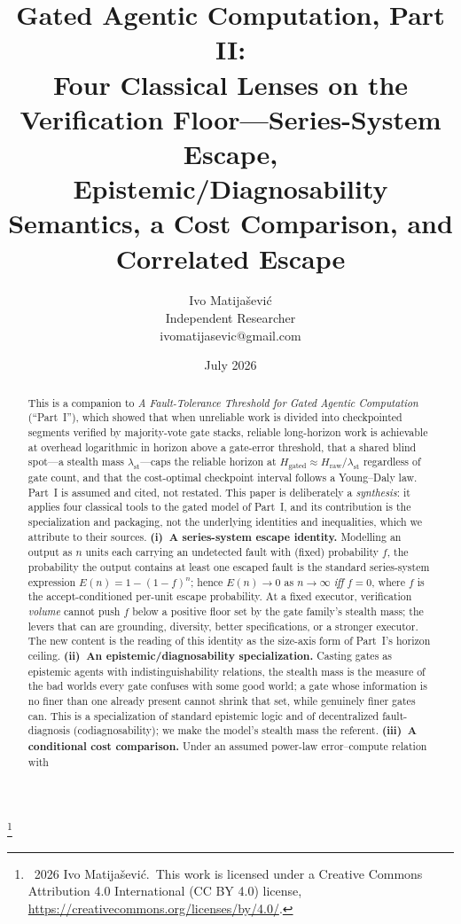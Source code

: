 \documentclass[11pt]{article}
\title{\vspace{-2em}Gated Agentic Computation, Part II:\\
\large Four Classical Lenses on the Verification Floor---Series-System Escape,\\
Epistemic/Diagnosability Semantics, a Cost Comparison, and Correlated Escape}
\author{Ivo Matija\v{s}evi\'c\\ \small Independent Researcher \\ \small ivomatijasevic@gmail.com}
\date{July 2026}
\theoremstyle{definition}
\theoremstyle{remark}
\newcommand{\lst}{\lambda_{\mathrm{st}}}
\newcommand{\Hraw}{H_{\mathrm{raw}}}
\newcommand{\Hgated}{H_{\mathrm{gated}}}
\newcommand{\Esc}{E}
\newcommand{\fesc}{f}
\newcommand\blfootnote[1]{\begingroup\renewcommand\thefootnote{}\footnote{#1}\addtocounter{footnote}{-1}\endgroup}
\begin{document}
\maketitle
\blfootnote{\textcopyright~2026 Ivo Matija\v{s}evi\'c.\ This work is licensed under a Creative Commons
Attribution 4.0 International (CC BY 4.0) license, \url{https://creativecommons.org/licenses/by/4.0/}.}

\begin{abstract}
This is a companion to \emph{A Fault-Tolerance Threshold for Gated Agentic
Computation}~\cite{matijasevic2026n1} (``Part~I''), which showed that when unreliable work is divided
into checkpointed segments verified by majority-vote gate stacks, reliable long-horizon work is
achievable at overhead logarithmic in horizon above a gate-error threshold, that a shared blind
spot---a stealth mass $\lst$---caps the reliable horizon at $\Hgated \approx \Hraw/\lst$ regardless
of gate count, and that the cost-optimal checkpoint interval follows a Young--Daly law.
Part~I is assumed and cited, not restated.
This paper is deliberately a \emph{synthesis}: it applies four classical tools to the gated model of
Part~I, and its contribution is the specialization and packaging, not the underlying identities and
inequalities, which we attribute to their sources.
\textbf{(i)~A series-system escape identity.} Modelling an output as $n$ units each carrying an
undetected fault with (fixed) probability $\fesc$, the probability the output contains at least one
escaped fault is the standard series-system expression $\Esc(n)=1-(1-\fesc)^n$; hence $\Esc(n)\to 0$
as $n\to\infty$ \emph{iff} $\fesc=0$, where $\fesc$ is the accept-conditioned per-unit escape
probability. At a fixed executor, verification \emph{volume} cannot push $\fesc$ below a positive floor
set by the gate family's stealth mass; the levers that can are grounding, diversity, better
specifications, or a stronger executor. The new content is the reading of this
identity as the size-axis form of Part~I's horizon ceiling.
\textbf{(ii)~An epistemic/diagnosability specialization.} Casting gates as epistemic agents with
indistinguishability relations, the stealth mass is the measure of the bad worlds every gate confuses
with some good world; a gate whose information is no finer than one already present cannot shrink that
set, while genuinely finer gates can. This is a specialization of standard epistemic logic and of
decentralized fault-diagnosis (codiagnosability); we make the model's stealth mass the referent.
\textbf{(iii)~A conditional cost comparison.} Under an assumed power-law error--compute relation with

\end{abstract}
\end{document}
